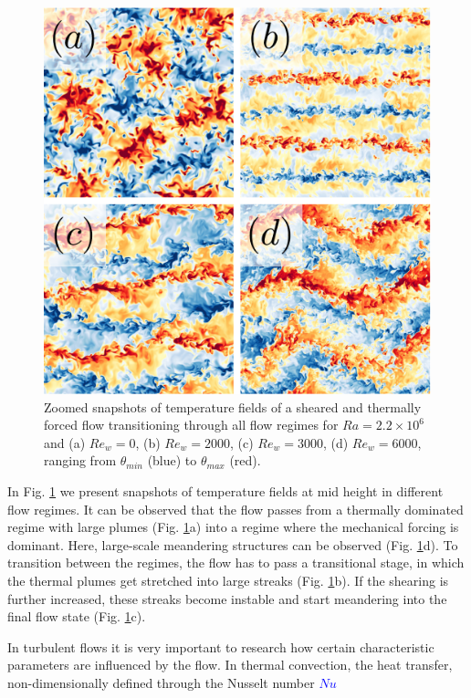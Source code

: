 \documentclass[5p,times]{elsarticle}
\begin{document}

\begin{figure}
	\centering
	\includegraphics[width=0.8\linewidth]{squaredoverview}%
	\caption{\label{fig:overview} Zoomed snapshots of temperature fields
of a sheared and thermally forced flow transitioning through all flow regimes
for $ Ra=2.2 \times 10^6 $ and (a) $ Re_w=0 $, (b) $ Re_w=2000 $, (c) $ Re_w=3000 $, (d) $ Re_w=6000 $, ranging from $ \theta_{min} $ (blue) to $ \theta_{max} $ (red).}
\end{figure}

In Fig. \ref{fig:overview} we present snapshots of temperature
fields at mid height in different flow regimes. It can be observed that the flow passes from a
thermally dominated regime with large plumes (Fig. \ref{fig:overview}a) into a
regime where the mechanical forcing is dominant. Here, large-scale meandering
structures can be observed (Fig. \ref{fig:overview}d). To transition between the
regimes, the flow has to pass a transitional stage, in which the thermal plumes
get stretched into large streaks (Fig. \ref{fig:overview}b). If the shearing is
further increased, these streaks become instable and start meandering into the
final flow state (Fig. \ref{fig:overview}c).

In turbulent flows it is very important to research how certain characteristic
parameters are influenced by the flow. In thermal convection, the heat transfer, non-dimensionally
defined through the Nusselt number \textcolor{blue}{$Nu$}
\end{document}
